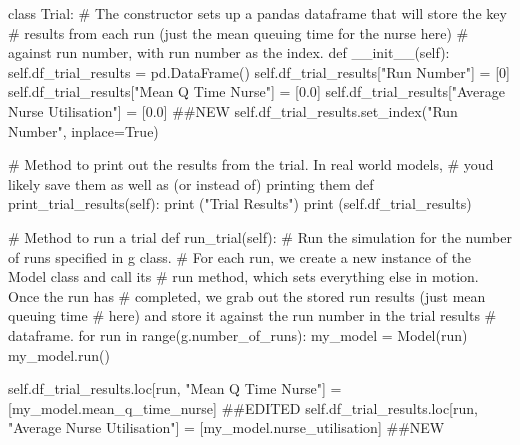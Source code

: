\documentclass[
  letterpaper,
  DIV=11,
  numbers=noendperiod]{scrreprt}
\newenvironment{Shaded}{}{}
\newcommand{\BuiltInTok}[1]{\textcolor[rgb]{0.84,0.23,0.29}{#1}}
\newcommand{\CommentTok}[1]{\textcolor[rgb]{0.42,0.45,0.49}{#1}}
\newcommand{\ControlFlowTok}[1]{\textcolor[rgb]{0.84,0.23,0.29}{#1}}
\newcommand{\DecValTok}[1]{\textcolor[rgb]{0.00,0.36,0.77}{#1}}
\newcommand{\FloatTok}[1]{\textcolor[rgb]{0.00,0.36,0.77}{#1}}
\newcommand{\FunctionTok}[1]{\textcolor[rgb]{0.44,0.26,0.76}{#1}}
\newcommand{\KeywordTok}[1]{\textcolor[rgb]{0.84,0.23,0.29}{#1}}
\newcommand{\NormalTok}[1]{\textcolor[rgb]{0.14,0.16,0.18}{#1}}
\newcommand{\OperatorTok}[1]{\textcolor[rgb]{0.14,0.16,0.18}{#1}}
\newcommand{\StringTok}[1]{\textcolor[rgb]{0.01,0.18,0.38}{#1}}
\newcommand{\VariableTok}[1]{\textcolor[rgb]{0.89,0.38,0.04}{#1}}
\begin{document}
\begin{tcolorbox}
\begin{Shaded}
\begin{Highlighting}[]
\KeywordTok{class}\NormalTok{ Trial:}
    \CommentTok{\# The constructor sets up a pandas dataframe that will store the key}
    \CommentTok{\# results from each run (just the mean queuing time for the nurse here)}
    \CommentTok{\# against run number, with run number as the index.}
    \KeywordTok{def}  \FunctionTok{\_\_init\_\_}\NormalTok{(}\VariableTok{self}\NormalTok{):}
        \VariableTok{self}\NormalTok{.df\_trial\_results }\OperatorTok{=}\NormalTok{ pd.DataFrame()}
        \VariableTok{self}\NormalTok{.df\_trial\_results[}\StringTok{"Run Number"}\NormalTok{] }\OperatorTok{=}\NormalTok{ [}\DecValTok{0}\NormalTok{]}
        \VariableTok{self}\NormalTok{.df\_trial\_results[}\StringTok{"Mean Q Time Nurse"}\NormalTok{] }\OperatorTok{=}\NormalTok{ [}\FloatTok{0.0}\NormalTok{]}
        \VariableTok{self}\NormalTok{.df\_trial\_results[}\StringTok{"Average Nurse Utilisation"}\NormalTok{] }\OperatorTok{=}\NormalTok{ [}\FloatTok{0.0}\NormalTok{] }\CommentTok{\#\#NEW}
        \VariableTok{self}\NormalTok{.df\_trial\_results.set\_index(}\StringTok{"Run Number"}\NormalTok{, inplace}\OperatorTok{=}\VariableTok{True}\NormalTok{)}

    \CommentTok{\# Method to print out the results from the trial.  In real world models,}
    \CommentTok{\# you\textquotesingle{}d likely save them as well as (or instead of) printing them}
    \KeywordTok{def}\NormalTok{ print\_trial\_results(}\VariableTok{self}\NormalTok{):}
        \BuiltInTok{print}\NormalTok{ (}\StringTok{"Trial Results"}\NormalTok{)}
        \BuiltInTok{print}\NormalTok{ (}\VariableTok{self}\NormalTok{.df\_trial\_results)}

    \CommentTok{\# Method to run a trial}
    \KeywordTok{def}\NormalTok{ run\_trial(}\VariableTok{self}\NormalTok{):}
        \CommentTok{\# Run the simulation for the number of runs specified in g class.}
        \CommentTok{\# For each run, we create a new instance of the Model class and call its}
        \CommentTok{\# run method, which sets everything else in motion.  Once the run has}
        \CommentTok{\# completed, we grab out the stored run results (just mean queuing time}
        \CommentTok{\# here) and store it against the run number in the trial results}
        \CommentTok{\# dataframe.}
        \ControlFlowTok{for}\NormalTok{ run }\KeywordTok{in} \BuiltInTok{range}\NormalTok{(g.number\_of\_runs):}
\NormalTok{            my\_model }\OperatorTok{=}\NormalTok{ Model(run)}
\NormalTok{            my\_model.run()}

            \VariableTok{self}\NormalTok{.df\_trial\_results.loc[run, }\StringTok{"Mean Q Time Nurse"}\NormalTok{] }\OperatorTok{=}\NormalTok{ [my\_model.mean\_q\_time\_nurse] }\CommentTok{\#\#EDITED}
            \VariableTok{self}\NormalTok{.df\_trial\_results.loc[run, }\StringTok{"Average Nurse Utilisation"}\NormalTok{] }\OperatorTok{=}\NormalTok{ [my\_model.nurse\_utilisation] }\CommentTok{\#\#NEW}


\end{Highlighting}
\end{Shaded}
\end{tcolorbox}
\end{document}
